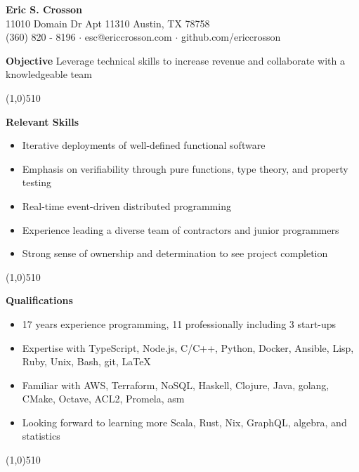 \documentclass{report}
\newcommand{\cut}{\begin{center} \line(1,0){510} \end{center}}
\begin{document}
\pagestyle{empty}
\setlength\parindent{0pt}

\begin{center}
  \textbf{Eric S. Crosson} \\
  11010 Domain Dr Apt 11310 Austin, TX 78758 \\
  (360) 820 - 8196 $\cdot$ esc@ericcrosson.com $\cdot$ github.com/ericcrosson
\end{center}

\textbf{Objective} \hspace{1mm} Leverage technical skills to increase
revenue and collaborate with a knowledgeable team

\cut{}

\textbf{Relevant Skills}
\begin{itemize}[label=$\cdot$]
\item Iterative deployments of well-defined functional software
\item Emphasis on verifiability through pure functions, type theory, and property testing
\item Real-time event-driven distributed programming
\item Experience leading a diverse team of contractors and junior programmers
\item Strong sense of ownership and determination to see project completion
\end{itemize}

\cut{}

\textbf{Qualifications}
\begin{itemize}[label=$\cdot$]
\item 17 years experience programming, 11 professionally including 3 start-ups
\item Expertise with TypeScript, Node.js, C/C++, Python, Docker, Ansible, Lisp, Ruby, Unix, Bash, git, \LaTeX{}
\item Familiar with AWS, Terraform, NoSQL, Haskell, Clojure, Java, golang, CMake, Octave, ACL2, Promela, asm
\item Looking forward to learning more Scala, Rust, Nix, GraphQL, algebra, and statistics
\end{itemize}

\cut{}
\end{document}
